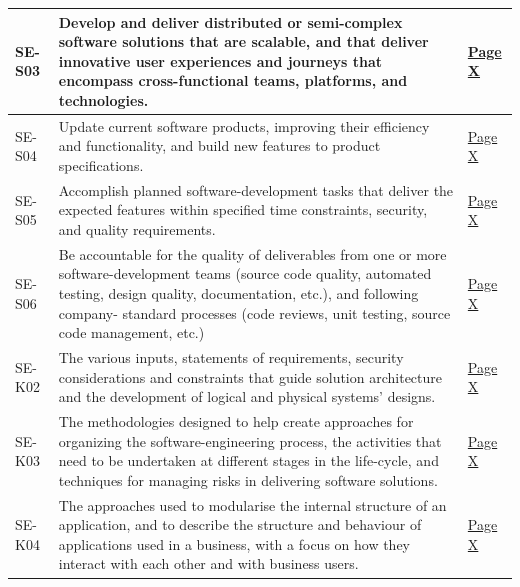 \begin{longtable}{|p{2.5cm}|p{10cm}|p{1.5cm}|}
      SE-S03              & Develop and deliver distributed or semi-complex software solutions
                            that are scalable, and that deliver innovative user experiences and
                            journeys that encompass cross-functional teams, platforms, and technologies. & \hyperref[sec:cicd]{Page X} \\ \hline

      SE-S04              & Update current software products, improving their efficiency and
                            functionality, and build new features to product specifications. & \hyperref[sec:cicd]{Page X} \\ \hline

      SE-S05              & Accomplish planned software-development tasks that deliver the expected
                            features within specified time constraints, security, and quality requirements. & \hyperref[sec:cicd]{Page X} \\ \hline

      SE-S06              & Be accountable for the quality of deliverables from one or more
                            software-development teams (source code quality, automated testing,
                            design quality, documentation, etc.), and following company-
                            standard processes (code reviews, unit testing, source code management, etc.)  & \hyperref[sec:cicd]{Page X} \\ \hline

      SE-K02              & The various inputs, statements of requirements, security considerations
                            and constraints that guide solution architecture and the development
                            of logical and physical systems' designs. & \hyperref[sec:cicd]{Page X} \\ \hline

      SE-K03              & The methodologies designed to help create approaches for organizing
                            the software-engineering process, the activities that need to be
                            undertaken at different stages in the life-cycle, and techniques for
                            managing risks in delivering software solutions. & \hyperref[sec:cicd]{Page X} \\ \hline

      SE-K04              & The approaches used to modularise the internal structure of an
                            application, and to describe the structure and behaviour of applications
                            used in a business, with a focus on how they interact with each other
                            and with business users. & \hyperref[sec:cicd]{Page X} \\ \hline


\end{longtable}
